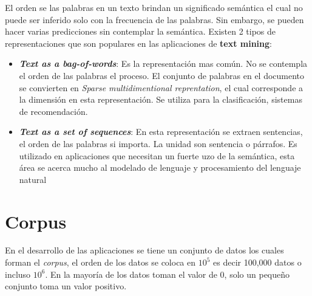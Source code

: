 El orden se las palabras en un texto brindan un significado semántica el cual no puede ser inferido  solo con la frecuencia de las palabras. Sin embargo, se pueden hacer varias predicciones sin contemplar la semántica. Existen 2 tipos de representaciones que son populares en las aplicaciones de \textbf{text mining}:

\begin{itemize}
	
	\item \textbf{\textit{Text as a bag-of-words}}: Es la representación mas común. No se contempla el orden de las palabras el proceso. El conjunto de palabras en el documento se convierten en \textit{Sparse multidimentional reprentation}, el cual corresponde a la dimensión en esta representación. Se utiliza para la clasificación, sistemas de recomendación.

	\item \textbf{\textit{Text as a set of sequences}}: En esta representación se extraen sentencias, el orden de las palabras si importa. La unidad son sentencia o párrafos. Es utilizado en aplicaciones que necesitan un fuerte uzo de la semántica, esta área se acerca mucho al modelado de lenguaje y procesamiento del lenguaje natural

\end{itemize}

\section{Corpus}

En el desarrollo de las aplicaciones se tiene un conjunto de datos los cuales forman el \textit{corpus}, el orden de los datos se coloca en $10^5$ es decir 100,000 datos o incluso $10^6$. En la mayoría de los datos toman el valor de 0, solo un pequeño conjunto toma un valor positivo.



